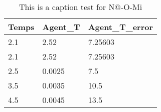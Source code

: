 \begin{table}[h]
	\caption{This is a caption test for N@-O-Mi}\label{tab:This is a label test for N@-O-Mi}
		\begin{tabular}{|l|l|l|}
		\hline
		Temps & Agent_T & Agent_T_error\\ \hline
		2.1 & 2.52 & 7.25603\\ \hline
		2.1 & 2.52 & 7.25603\\ \hline
		2.5 & 0.0025 & 7.5\\ \hline
		3.5 & 0.0035 & 10.5\\ \hline
		4.5 & 0.0045 & 13.5\\ \hline
		\hline
	\end{tabular}
\end{table}
